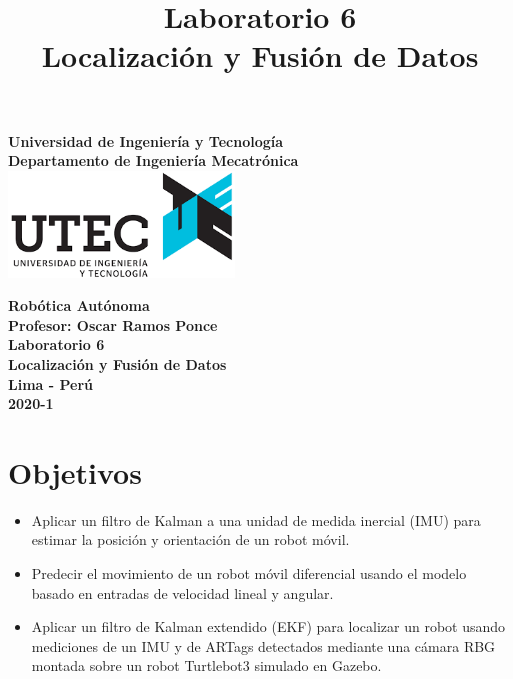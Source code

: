 \documentclass[a4paper,11pt]{robotlabs}
\title{
  \textbf{Laboratorio 6 \\ Localización y Fusión de Datos}
  \date{}
}
\begin{document}

\thispagestyle{empty}
\begin{center}
\textbf{{\huge Universidad de Ingenier\'ia y Tecnolog\'ia}\\ [.5cm]
 {\LARGE Departamento de Ingenier\'ia  Mecatr\'onica}\\[3cm]
}
{\includegraphics[width=6cm]{images/utec}}\\[3cm]
\end{center}

\begin{center}
  {\LARGE \textbf{Robótica Autónoma}}\\[0.8cm]
  {\Large \textbf{Profesor: Oscar Ramos Ponce}}\\[3.0cm]
  {\Large \textbf{Laboratorio 6}}\\[0.5cm]
  {\Large \textbf{Localización y Fusión de Datos}}\\[4.8cm] %
  {\Large \textbf{Lima - Perú}} \\[0.5cm]
  {\LARGE \textbf{2020-1}}
\end{center}

\newpage
\maketitle
\thispagestyle{fancyplain}


\section{Objetivos}

\begin{itemize}
\item Aplicar un filtro de Kalman a una unidad de medida inercial (IMU) para
  estimar la posición y orientación de un robot móvil.
\item Predecir el movimiento de un robot móvil diferencial usando el modelo
  basado en entradas de velocidad lineal y angular.
\item Aplicar un filtro de Kalman extendido (EKF) para localizar un robot
  usando mediciones de un IMU y de ARTags detectados mediante una cámara RBG
  montada sobre un robot Turtlebot3 simulado en Gazebo.
\end{itemize}
\end{document}
